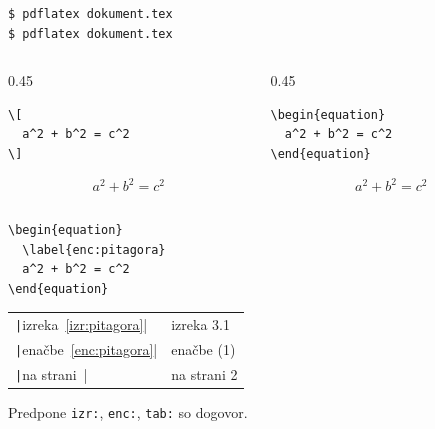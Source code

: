 \documentclass[aspectratio=169]{beamer}
\begin{document}
\begin{frame}[fragile]{}
  \begin{verbatim}
$ pdflatex dokument.tex
$ pdflatex dokument.tex
  \end{verbatim}
\end{frame}

\begin{frame}[fragile]{}
  \begin{columns}[T]
    \begin{column}{0.45\textwidth}
      \begin{verbatim}
\[
  a^2 + b^2 = c^2
\]
      \end{verbatim}
      \[
        a^2 + b^2 = c^2
      \]
    \end{column}
    \begin{column}{0.45\textwidth}
      \begin{verbatim}
\begin{equation}
  a^2 + b^2 = c^2
\end{equation}
      \end{verbatim}
      \begin{equation}
        a^2 + b^2 = c^2
      \end{equation}
    \end{column}
  \end{columns}
\end{frame}

\begin{frame}[fragile]{}
  \begin{verbatim}
\begin{equation}
  \label{enc:pitagora}
  a^2 + b^2 = c^2
\end{equation}
  \end{verbatim}
  \medskip

  \begin{tabular}{ll}
    \texttt|izreka~\ref{izr:pitagora}| & izreka 3.1 \\
    \texttt|enačbe~\eqref{enc:pitagora}| & enačbe (1) \\
    \texttt|na strani~\pageref{izr:pitagora}| & na strani 2 \\
  \end{tabular}
  \medskip

  Predpone \texttt{izr:}, \texttt{enc:}, \texttt{tab:} so dogovor.
\end{frame}
\end{document}
